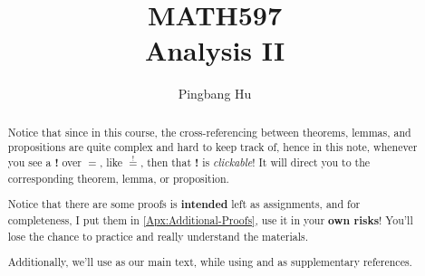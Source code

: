 \documentclass[a4paper]{article}
\author{Pingbang Hu}
\title{MATH597\\Analysis II}
\begin{document}
\maketitle

\begin{abstract}
	Notice that since in this course, the cross-referencing between theorems, lemmas, and propositions are quite complex and
	hard to keep track of, hence in this note, whenever you see a \textbf{!} over \(=\), like \(\overset{!}{=}\), then that
	\textbf{!} is \emph{clickable}! It will direct you to the corresponding theorem, lemma, or proposition.

	\par Notice that there are some proofs is \textbf{intended} left as assignments, and for completeness, I put them in \autoref{Apx:Additional-Proofs},
	use it in your \textbf{own risks}! You'll lose the chance to practice and really understand the materials.

	\par Additionally, we'll use \cite{folland1999real} as our main text, while using \cite{tao2013introduction} and \cite{axler2019measure} as supplementary references.
\end{abstract}

\tableofcontents


\newpage
\appendix
\appendixpage



\newpage
\printbibliography
\end{document}
